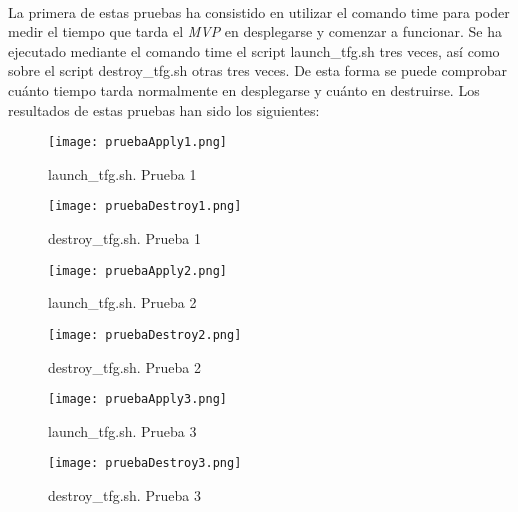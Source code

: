 \documentclass[../../memoria.tex]{subfiles}
\begin{document}
\paragraph{}
La primera de estas pruebas ha consistido en utilizar el comando time \cite{timelinuxcom} para poder medir el tiempo que tarda el \textit{MVP} en desplegarse y comenzar a funcionar. Se ha ejecutado mediante el comando time el script launch\_tfg.sh tres veces, así como sobre el script destroy\_tfg.sh otras tres veces. De esta forma se puede comprobar cuánto tiempo tarda normalmente en desplegarse y cuánto en destruirse. Los resultados de estas pruebas han sido los siguientes:

\begin{figure}[H]
    \centering
    \begin{minipage}{.5\textwidth}
        \centering
        \texttt{[image: pruebaApply1.png]}
        \caption{launch\_tfg.sh. Prueba 1}
        \label{fig:pruebaApply1}
    \end{minipage}%
    \begin{minipage}{.5\textwidth}
        \centering
        \texttt{[image: pruebaDestroy1.png]}
        \caption{destroy\_tfg.sh. Prueba 1}
        \label{fig:pruebaDestroy1}
    \end{minipage}
\end{figure}

\begin{figure}[H]
    \centering
    \begin{minipage}{.5\textwidth}
        \centering
        \texttt{[image: pruebaApply2.png]}
        \caption{launch\_tfg.sh. Prueba 2}
        \label{fig:pruebaApply2}
    \end{minipage}%
    \begin{minipage}{.5\textwidth}
        \centering
        \texttt{[image: pruebaDestroy2.png]}
        \caption{destroy\_tfg.sh. Prueba 2}
        \label{fig:pruebaDestroy2}
    \end{minipage}
\end{figure}

\begin{figure}[H]
    \centering
    \begin{minipage}{.5\textwidth}
        \centering
        \texttt{[image: pruebaApply3.png]}
        \caption{launch\_tfg.sh. Prueba 3}
        \label{fig:pruebaApply3}
    \end{minipage}%
    \begin{minipage}{.5\textwidth}
        \centering
        \texttt{[image: pruebaDestroy3.png]}
        \caption{destroy\_tfg.sh. Prueba 3}
        \label{fig:pruebaDestroy3}
    \end{minipage}
\end{figure}
\end{document}
